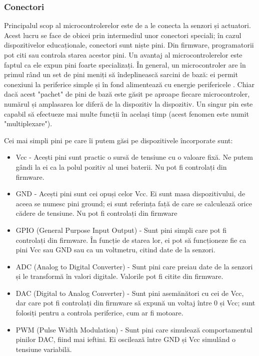 \subsubsection{Conectori}
\label{sec:embed-ics-micro-con}

Principalul scop al microcontrolerelor este de a le conecta la senzori și
actuatori. Acest lucru se face de obicei prin intermediul unor conectori
speciali; în cazul dispozitivelor educaționale, conectori sunt niște pini. Din
firmware, programatorii pot citi sau controla starea acestor pini. Un avantaj al
microcontrolerelor este faptul ca ele expun pini foarte specializați. În
general, un microcontroler are în primul rând un set de pini meniți să
îndeplinească sarcini de bază: ei permit conexiuni la periferice simple și în
fond alimentează cu energie perifericele . Chiar dacă acest "pachet" de pini de
bază este găsit pe aproape fiecare microcontroler, numărul și amplasarea lor
diferă de la dispozitiv la dispozitiv. Un singur pin este capabil să efectueze
mai multe funcții în același timp (acest fenomen este numit "multiplexare").

Cei mai simpli pini pe care îi putem găsi pe dispozitivele încorporate sunt:

\begin{itemize}
	\item Vcc - Acești pini sunt practic o sursă de tensiune cu o valoare
		fixă. Ne putem gândi la ei ca la polul pozitiv al unei baterii.
		Nu pot fi controlați din firmware.
	\item GND - Acești pini sunt cei opuși celor Vcc. Ei sunt masa
		dispozitivului, de aceea se numesc pini ground; ei sunt
		referința față de care se calculează orice cădere de tensiune.
		Nu pot fi controlați din firmware
	\item GPIO (General Purpose Input Output) - Sunt pini simpli care pot fi
		controlați din firmware. În funcție de starea lor, ei pot să
		funcționeze fie ca pini Vcc sau GND sau ca un voltmetru, citind
		date de la senzori.
	\item ADC (Analog to Digital Converter) - Sunt pini care preiau date de
		la senzori și le transformă în valori digitale. Valorile pot fi
		citite din firmware.
	\item DAC (Digital to Analog Converter) - Sunt pini asemănători cu cei
		de Vcc, dar care pot fi controlați din firmware să expună un
		voltaj între 0 și Vcc; sunt folosiți pentru a controla
		periferice, cum ar fi motoare.
	\item PWM (Pulse Width Modulation) - Sunt pini care simulează
		comportamentul pinilor DAC, fiind mai ieftini. Ei oscilează
		între GND și Vcc simulând o tensiune variabilă.
\end{itemize}

